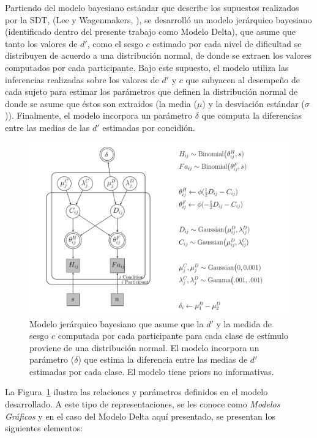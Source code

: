 Partiendo del modelo bayesiano estándar que describe los supuestos realizados por la SDT, (Lee y Wagenmakers, \citeyear{LeeBook}), se desarrolló un modelo jerárquico bayesiano (identificado dentro del presente trabajo como Modelo Delta), que asume que tanto los valores de $d'$, como el sesgo $c$ estimado por cada nivel de dificultad se distribuyen de acuerdo a una distribución normal, de donde se extraen los valores computados por cada participante. Bajo este supuesto, el modelo utiliza las inferencias realizadas sobre los valores de $d'$ y $c$ que subyacen al desempeño de cada sujeto para estimar los parámetros que definen la distribución normal de donde se asume que éstos son extraidos (la media ($\mu$) y la desviación estándar ($\sigma$)). Finalmente, el modelo incorpora un parámetro $\delta$ que computa la diferencias entre las medias de las $d'$ estimadas por concidión.\\

\begin{figure}[th]
\centering
\includegraphics[width=1.1\textwidth]{Figures/Model_Delta_Diff_D}
\caption[Modelo Delta: Modelo jerárquico bayesiano para evaluar las diferencias entre las medias de $d'$ de cada clase de estímulo]{Modelo jerárquico bayesiano que asume que la $d'$ y la medida de sesgo $c$ computada por cada participante para cada clase de estímulo proviene de una distribución normal. El modelo incorpora un parámetro ($\delta$) que estima la diferencia entre las medias de $d'$ estimadas por cada clase. El modelo tiene priors no informativas.}
\label{fig:Mod_Delta}
\end{figure}

La Figura~\ref{fig:Mod_Delta} ilustra las relaciones y parámetros definidos en el modelo desarrollado. A este tipo de representaciones, se les conoce como \textit{Modelos Gráficos} y en el caso del Modelo Delta aquí presentado, se presentan los siguientes elementos:\\

